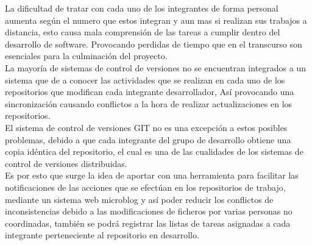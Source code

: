 \documentclass[letterpaper, 12pt,double,graphicx,caption,rotating]{report}
\begin{document}
\begin{titlepage}
La dificultad de tratar con cada uno de los integrantes de forma personal aumenta según el numero que estos integran y aun mas si realizan sus trabajos a distancia, esto causa mala comprensión de las tareas a cumplir dentro del desarrollo de software. Provocando perdidas de tiempo que en el transcurso son esenciales para la culminación del proyecto.\\

La mayoría de sistemas de control de versiones no se encuentran integrados a un sistema que de a conocer las actividades que se realizan en cada uno de los repositorios que modifican cada integrante desarrollador, Así provocando una sincronización causando conflictos a la hora de realizar actualizaciones en los repositorios.\\
El sistema de control de versiones GIT no es una excepción a estos posibles problemas, debido a que cada integrante del grupo de desarrollo obtiene una copia idéntica del repositorio, el cual es una de las cualidades de los sistemas de control de versiones distribuidas.\\

Es por esto que surge la idea de aportar con una herramienta para facilitar las notificaciones de las acciones que se efectúan en los repositorios de trabajo, mediante un sistema web microblog y así poder reducir los conflictos de inconsistencias debido a las modificaciones de ficheros por varias personas no coordinadas, también se podrá registrar las listas de tareas asignadas a cada integrante 
perteneciente al repositorio en desarrollo.

\end{titlepage}
\newpage
\tableofcontents









\end{document}
